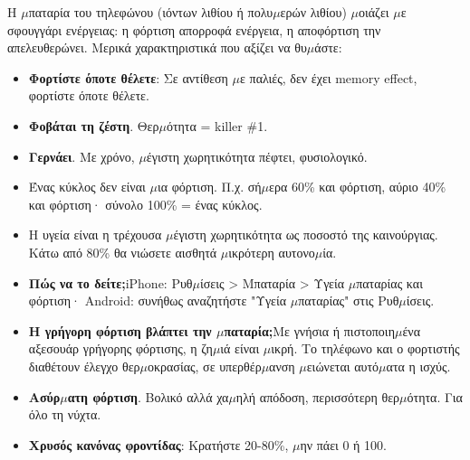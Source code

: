 


Η $\mu$παταρία του τηλεφώνου (ιόντων λιθίου ή πολυ$\mu$ερών λιθίου) $\mu$οιάζει $\mu$ε σφουγγάρι ενέργειας: η φόρτιση απορροφά ενέργεια, η αποφόρτιση την απελευθερώνει. Μερικά χαρακτηριστικά που αξίζει να θυ$\mu$άστε:

\begin{itemize}
  \item \textbf{Φορτίστε όποτε θέλετε}: Σε αντίθεση $\mu$ε παλιές, δεν έχει memory effect, φορτίστε όποτε θέλετε.
  \item \textbf{Φοβάται τη ζέστη}. Θερ$\mu$ότητα = killer \#1.
  \item \textbf{Γερνάει}. Με χρόνο, $\mu$έγιστη χωρητικότητα πέφτει, φυσιολογικό.
\end{itemize}


\begin{itemize}
  \item Ένας κύκλος δεν είναι $\mu$ια φόρτιση. Π.χ. σή$\mu$ερα 60\% και φόρτιση, αύριο 40\% και φόρτιση· σύνολο 100\% = ένας κύκλος.
  \item Η υγεία είναι η τρέχουσα $\mu$έγιστη χωρητικότητα ως ποσοστό της καινούργιας. Κάτω από 80\% θα νιώσετε αισθητά $\mu$ικρότερη αυτονο$\mu$ία.
  \item \textbf{Πώς να το δείτε;}iPhone: Ρυθ$\mu$ίσεις > Μπαταρία > Υγεία $\mu$παταρίας και φόρτιση· Android: συνήθως αναζητήστε "Υγεία $\mu$παταρίας" στις Ρυθ$\mu$ίσεις.
\end{itemize}


\begin{itemize}
  \item \textbf{Η γρήγορη φόρτιση βλάπτει την $\mu$παταρία;}Με γνήσια ή πιστοποιη$\mu$ένα αξεσουάρ γρήγορης φόρτισης, η ζη$\mu$ιά είναι $\mu$ικρή. Το τηλέφωνο και ο φορτιστής διαθέτουν έλεγχο θερ$\mu$οκρασίας, σε υπερθέρ$\mu$ανση $\mu$ειώνεται αυτό$\mu$ατα η ισχύς.
  \item \textbf{Ασύρ$\mu$ατη φόρτιση}. Βολικό αλλά χα$\mu$ηλή απόδοση, περισσότερη θερ$\mu$ότητα. Για όλο τη νύχτα.
  \item \textbf{Χρυσός κανόνας φροντίδας}: Κρατήστε 20-80\%, $\mu$ην πάει 0 ή 100.
\end{itemize}

